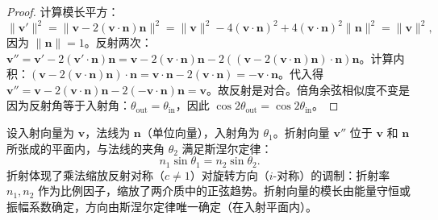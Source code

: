 \begin{proof}
计算模长平方：
\[\|\mathbf{v}'\|^2 = \|\mathbf{v} - 2(\mathbf{v}\cdot\mathbf{n})\mathbf{n}\|^2 = \|\mathbf{v}\|^2 - 4(\mathbf{v}\cdot\mathbf{n})^2 + 4(\mathbf{v}\cdot\mathbf{n})^2\|\mathbf{n}\|^2 = \|\mathbf{v}\|^2,\]
因为 $\|\mathbf{n}\|=1$。反射两次：$\mathbf{v}'' = \mathbf{v}' - 2(\mathbf{v}'\cdot\mathbf{n})\mathbf{n} = \mathbf{v} - 2(\mathbf{v}\cdot\mathbf{n})\mathbf{n} - 2((\mathbf{v} - 2(\mathbf{v}\cdot\mathbf{n})\mathbf{n})\cdot\mathbf{n})\mathbf{n}$。计算内积：$(\mathbf{v} - 2(\mathbf{v}\cdot\mathbf{n})\mathbf{n})\cdot\mathbf{n} = \mathbf{v}\cdot\mathbf{n} - 2(\mathbf{v}\cdot\mathbf{n}) = -\mathbf{v}\cdot\mathbf{n}$。代入得 $\mathbf{v}'' = \mathbf{v} - 2(\mathbf{v}\cdot\mathbf{n})\mathbf{n} - 2(-\mathbf{v}\cdot\mathbf{n})\mathbf{n} = \mathbf{v}$。故反射是对合。倍角余弦相似度不变是因为反射角等于入射角：$\theta_{\text{out}} = \theta_{\text{in}}$，因此 $\cos 2\theta_{\text{out}} = \cos 2\theta_{\text{in}}$。
\end{proof}

\begin{definition}[折射——正弦趋势的缩放]\label{def:refraction_vector}
设入射向量为 $\mathbf{v}$，法线为 $\mathbf{n}$（单位向量），入射角为 $\theta_1$。折射向量 $\mathbf{v}''$ 位于 $\mathbf{v}$ 和 $\mathbf{n}$ 所张成的平面内，与法线的夹角 $\theta_2$ 满足斯涅尔定律：
\[n_1 \sin\theta_1 = n_2 \sin\theta_2.\]
折射体现了乘法缩放反射对称（$c \neq 1$）对旋转方向（$i$-对称）的调制：折射率 $n_1, n_2$ 作为比例因子，缩放了两介质中的正弦趋势。折射向量的模长由能量守恒或振幅系数确定，方向由斯涅尔定律唯一确定（在入射平面内）。
\end{definition}

